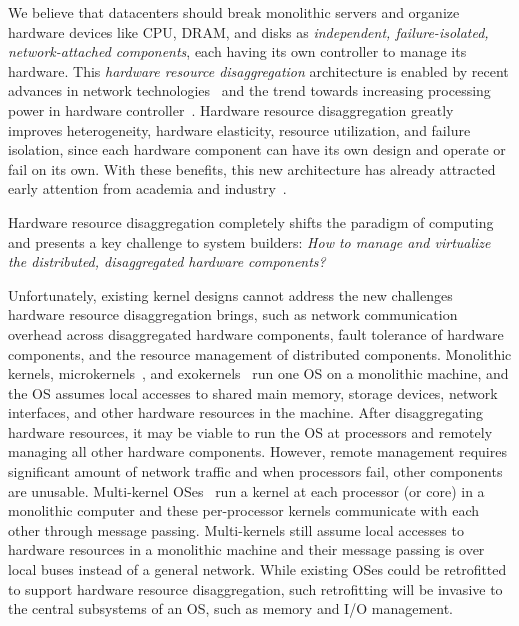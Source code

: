 \documentclass[10pt,times,twocolumn]{z2-article}
\begin{document}
We believe that datacenters should break monolithic servers
and organize hardware devices like CPU, DRAM, and disks 
as {\em independent, failure-isolated, network-attached components},
each having its own controller to manage its hardware.
This {\em hardware resource disaggregation} architecture %
is enabled by recent advances in network technologies~\cite{IB-RTT,GenZ,Mellanox-ConnectX6-IB,OpenCAPI,Omni-Path,ccix} 
and the trend towards increasing processing power in hardware controller~\cite{Willow,Ahn15-PIM,Bojnordi12}.
Hardware resource disaggregation greatly improves heterogeneity, hardware elasticity, 
resource utilization, and failure isolation,
since each hardware component can have its own design and operate or fail on its own.
With these benefits, this new architecture has already attracted early attention 
from academia and industry~\cite{OCP,HP-TheMachine,FireBox-FASTKeynote,Lim09-disaggregate,Nitu18-EUROSYS,dRedBox-DATE}.

Hardware resource disaggregation completely shifts the paradigm of computing
and presents a key challenge to system builders:
{\em How to manage and virtualize the distributed, disaggregated hardware components?}


Unfortunately, existing kernel designs cannot address the new challenges hardware resource disaggregation brings,
such as network communication overhead across disaggregated hardware components, fault tolerance of hardware components, 
and the resource management of distributed components.
Monolithic kernels, microkernels~\cite{seL4-SOSP13}, and exokernels~\cite{Exokernel-SOSP95} run one OS on a monolithic machine,
and the OS assumes local accesses to shared main memory, storage devices, network interfaces, 
and other hardware resources in the machine.
After disaggregating hardware resources, it may be viable to run the OS at processors and remotely managing all other hardware components. 
However, remote management requires significant amount of network traffic
and when processors fail, other components are unusable.
Multi-kernel OSes~\cite{Baumann-SOSP09,Helios-SOSP,fos-SOCC,Hive-SOSP} run a kernel
at each processor (or core) in a monolithic computer and these per-processor kernels communicate with each other through message passing.
Multi-kernels still assume local accesses to hardware resources in a monolithic machine
and their message passing is over local buses instead of a general network.
While existing OSes could be retrofitted to support hardware resource disaggregation, 
such retrofitting will be invasive to the central subsystems of an OS, such as memory and I/O management.
\end{document}
